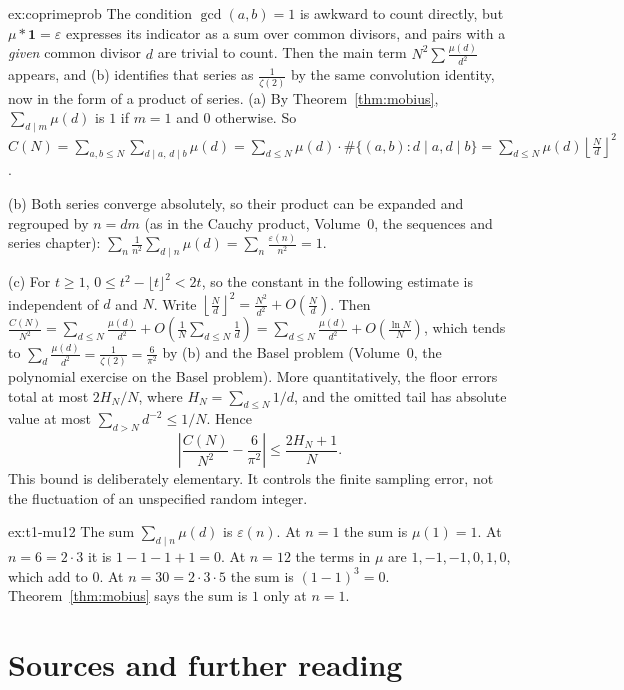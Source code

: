 \begin{solution}{ex:coprimeprob}
\idea The condition $\gcd(a,b)=1$ is awkward to count directly, but $\mu*\mathbf 1=\varepsilon$ expresses its indicator as a sum over common divisors, and pairs with a \emph{given} common divisor $d$ are trivial to count. Then the main term $N^2\sum\frac{\mu(d)}{d^2}$ appears, and (b) identifies that series as $\frac1{\zeta(2)}$ by the same convolution identity, now in the form of a product of series.
\writeup (a) By Theorem~\ref{thm:mobius}, $\sum_{d\mid m}\mu(d)$ is $1$ if $m=1$ and $0$ otherwise. So
$C(N)=\sum_{a,b\le N}\sum_{d\mid a,\,d\mid b}\mu(d)=\sum_{d\le N}\mu(d)\cdot\#\{(a,b):d\mid a,d\mid b\}=\sum_{d\le N}\mu(d)\left\lfloor\frac Nd\right\rfloor^2$.

(b) Both series converge absolutely, so their product can be expanded and regrouped by $n=dm$ (as in the Cauchy product, Volume~0, the sequences and series chapter): $\sum_n\frac1{n^2}\sum_{d\mid n}\mu(d)=\sum_n\frac{\varepsilon(n)}{n^2}=1$.

(c) For $t\ge1$, $0\le t^2-\lfloor t\rfloor^2<2t$, so the
constant in the following estimate is independent of $d$ and $N$.
Write $\left\lfloor\frac Nd\right\rfloor^2=\frac{N^2}{d^2}+O\left(\frac Nd\right)$. Then
$\frac{C(N)}{N^2}=\sum_{d\le N}\frac{\mu(d)}{d^2}+O\left(\frac1N\sum_{d\le N}\frac1d\right)=\sum_{d\le N}\frac{\mu(d)}{d^2}+O\left(\frac{\ln N}N\right)$,
which tends to $\sum_d\frac{\mu(d)}{d^2}=\frac1{\zeta(2)}=\frac6{\pi^2}$ by (b) and the Basel problem (Volume~0, the polynomial exercise on the Basel problem).
More quantitatively, the floor errors total at most $2H_N/N$, where
$H_N=\sum_{d\le N}1/d$, and the omitted tail has absolute value at most
$\sum_{d>N}d^{-2}\le1/N$. Hence
\[
\left|\frac{C(N)}{N^2}-\frac6{\pi^2}\right|
\le\frac{2H_N+1}{N}.
\]
This bound is deliberately elementary. It controls the finite sampling error,
not the fluctuation of an unspecified random integer.

\end{solution}

\begin{solution}{ex:t1-mu12}
\idea The sum $\sum_{d\mid n}\mu(d)$ is $\varepsilon(n)$.
\writeup At $n=1$ the sum is $\mu(1)=1$. At $n=6=2\cdot 3$ it is $1-1-1+1=0$. At $n=12$ the terms in $\mu$ are $1,-1,-1,0,1,0$, which add to $0$. At $n=30=2\cdot 3\cdot 5$ the sum is $(1-1)^3=0$. Theorem~\ref{thm:mobius} says the sum is $1$ only at $n=1$.
\end{solution}

\section*{Sources and further reading}

